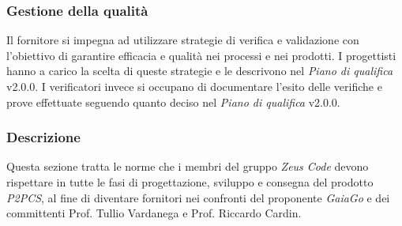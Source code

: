 	\subsubsection{Gestione della qualità}
	Il fornitore si impegna ad utilizzare strategie di verifica e validazione con l'obiettivo di garantire efficacia e qualità nei processi e nei prodotti. I progettisti hanno a carico la scelta di queste strategie e le descrivono nel \textit{Piano di qualifica} v2.0.0. I verificatori invece si occupano di documentare l'esito delle verifiche e prove effettuate seguendo quanto deciso nel \textit{Piano di qualifica} v2.0.0.
	\subsubsection{Descrizione}
	Questa sezione tratta le norme che i membri del gruppo \textit{Zeus Code} devono rispettare in tutte le fasi di progettazione, sviluppo e consegna del prodotto \textit{P2PCS}, al fine di diventare fornitori nei confronti del proponente \textit{GaiaGo} e dei committenti Prof. Tullio Vardanega e Prof. Riccardo Cardin.
